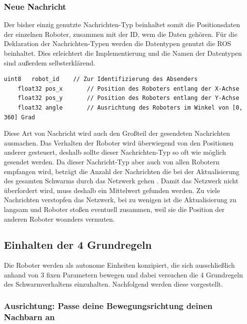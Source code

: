 \subsubsection*{Neue Nachricht}
Der bisher einzig genutzte Nachrichten-Typ beinhaltet somit die Positionsdaten der einzelnen Roboter, zusammen mit der ID, wem die Daten gehören. Für die Deklaration der Nachrichten-Typen werden die Datentypen genutzt die \ac{ROS} beinhaltet\cite{ROS_MSG}. Dies erleichtert die Implementierung und die Namen der Datentypen sind außerdem selbsterklärend.

\begin{lstlisting}[style=ros, title=Nachrichten-Typ: Robot\_Position.msg]
	uint8	robot_id	// Zur Identifizierung des Absenders
	float32 pos_x		// Position des Roboters entlang der X-Achse
	float32 pos_y		// Position des Roboters entlang der Y-Achse
	float32 angle		// Ausrichtung des Roboters im Winkel von [0, 360] Grad
\end{lstlisting}

Diese Art von Nachricht wird auch den Großteil der gesendeten Nachrichten ausmachen. Das Verhalten der Roboter wird überwiegend von den Positionen anderer gesteuert, deshalb sollte dieser Nachrichten-Typ so oft wie möglich gesendet werden. Da dieser Nachricht-Typ aber auch von allen Robotern empfangen wird, beträgt die Anzahl der Nachrichten die bei der Aktualisierung des gesamten Schwarms durch das Netzwerk gehen . Damit das Netzwerk nicht überfordert wird, muss deshalb ein Mittelwert gefunden werden. Zu viele Nachrichten verstopfen das Netzwerk, bei zu wenigen ist die Aktualisierung zu langsam und Roboter stoßen eventuell zusammen, weil sie die Position der anderen Roboter woanders vermuten.

\subsection*{Einhalten der 4 Grundregeln}
Die Roboter werden als autonome Einheiten konzipiert, die sich ausschließlich anhand von 3 fixen Parametern bewegen und dabei versuchen die 4 Grundregeln des Schwarmverhaltens einzuhalten. Nachfolgend werden diese vorgestellt.

\subsubsection*{Ausrichtung: Passe deine Bewegungsrichtung deinen Nachbarn an}

